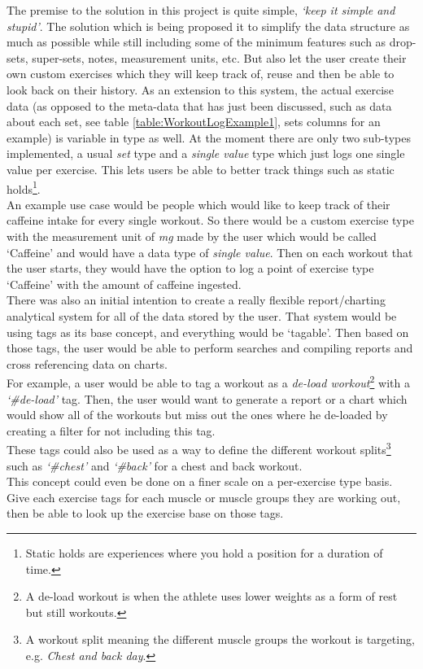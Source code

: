 \documentclass{article}
\begin{document}
\begin{multicols}{2}
The premise to the solution in this project is quite simple, \textit{`keep it simple and stupid'}. The solution which is being proposed it to simplify the data structure as much as possible while still including some of the minimum features such as drop-sets, super-sets, notes, measurement units, etc. But also let the user create their own custom exercises which they will keep track of, reuse and then be able to look back on their history. As an extension to this system, the actual exercise data (as opposed to the meta-data that has just been discussed, such as data about each set, see table \ref{table:WorkoutLogExample1}, sets columns for an example) is variable in type as well. At the moment there are only two sub-types implemented, a usual \textit{set} type and a \textit{single value} type which just logs one single value per exercise. This lets users be able to better track things such as static holds\footnote{Static holds are experiences where you hold a position for a duration of time.}.\\
An example use case would be people which would like to keep track of their caffeine intake for every single workout. So there would be a custom exercise type with the measurement unit of \textit{mg} made by the user which would be called  `Caffeine' and would have a data type of \textit{single value}. Then on each workout that the user starts, they would have the option to log a point of exercise type `Caffeine' with the amount of caffeine ingested.\\
There was also an initial intention to create a really flexible report/charting analytical system for all of the data stored by the user. That system would be using tags as its base concept, and everything would be `tagable'. Then based on those tags, the user would be able to perform searches and compiling reports and cross referencing data on charts.\\
For example, a user would be able to tag a workout as a \textit{de-load workout}\footnote{A de-load workout is when the athlete uses lower weights as a form of rest but still workouts.} with a \textit{`\#de-load'} tag. Then, the user would want to generate a report or a chart which would show all of the workouts but miss out the ones where he de-loaded by creating a filter for not including this tag.\\
These tags could also be used as a way to define the different workout splits\footnote{A workout split meaning the different muscle groups the workout is targeting, e.g. \textit{Chest and back day}.} such as \textit{`\#chest'} and \textit{`\#back'} for a chest and back workout.\\
This concept could even be done on a finer scale on a per-exercise type basis. Give each exercise tags for each muscle or muscle groups they are working out, then be able to look up the exercise base on those tags.\\


\end{multicols}
\end{document}
